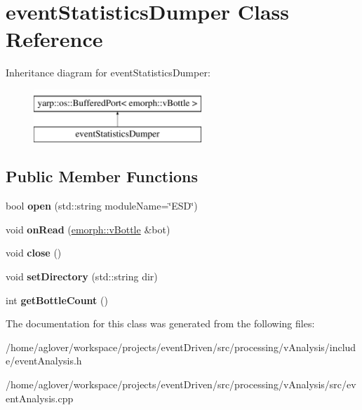 \hypertarget{classeventStatisticsDumper}{\section{event\-Statistics\-Dumper Class Reference}
\label{classeventStatisticsDumper}
}
Inheritance diagram for event\-Statistics\-Dumper\-:\begin{figure}[H]
\begin{center}
\leavevmode
\includegraphics[height=2.000000cm]{classeventStatisticsDumper}
\end{center}
\end{figure}
\subsection*{Public Member Functions}
\begin{DoxyCompactItemize}
\item 
\hypertarget{classeventStatisticsDumper_ae19ee350a1d131d0c54e0f7ac2437397}{bool {\bfseries open} (std\-::string module\-Name=\char`\"{}E\-S\-D\char`\"{})}\label{classeventStatisticsDumper_ae19ee350a1d131d0c54e0f7ac2437397}

\item 
\hypertarget{classeventStatisticsDumper_a5373c7abee32f595308f59c3d2c02c01}{void {\bfseries on\-Read} (\hyperlink{classemorph_1_1vBottle}{emorph\-::v\-Bottle} \&bot)}\label{classeventStatisticsDumper_a5373c7abee32f595308f59c3d2c02c01}

\item 
\hypertarget{classeventStatisticsDumper_aea5b77b83db3a9955e8fd8322d91dea1}{void {\bfseries close} ()}\label{classeventStatisticsDumper_aea5b77b83db3a9955e8fd8322d91dea1}

\item 
\hypertarget{classeventStatisticsDumper_a48c32b38d277f6b735c78cfbad6bcb64}{void {\bfseries set\-Directory} (std\-::string dir)}\label{classeventStatisticsDumper_a48c32b38d277f6b735c78cfbad6bcb64}

\item 
\hypertarget{classeventStatisticsDumper_af593efeee949a19d018aea33cbc5281a}{int {\bfseries get\-Bottle\-Count} ()}\label{classeventStatisticsDumper_af593efeee949a19d018aea33cbc5281a}

\end{DoxyCompactItemize}


The documentation for this class was generated from the following files\-:\begin{DoxyCompactItemize}
\item 
/home/aglover/workspace/projects/event\-Driven/src/processing/v\-Analysis/include/event\-Analysis.\-h\item 
/home/aglover/workspace/projects/event\-Driven/src/processing/v\-Analysis/src/event\-Analysis.\-cpp\end{DoxyCompactItemize}
